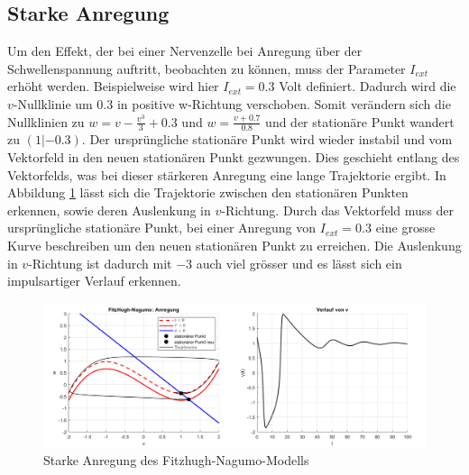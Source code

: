 \begin{refsection}
\subsection{Starke Anregung}
Um den Effekt, der bei einer Nervenzelle bei Anregung über der Schwellenspannung auftritt, beobachten zu können, muss
der Parameter $I_{ext}$ erhöht werden.
Beispielweise wird hier $I_{ext} = 0.3$ Volt definiert.
Dadurch wird die $v$-Nullklinie um 0.3 in positive w-Richtung verschoben.
Somit verändern sich die Nullklinien zu \( w = v - \frac{v^3}{3} + 0.3\)
und \(w = \frac{v + 0.7}{0.8}\) und der stationäre Punkt wandert zu $(1 |-0.3)$.
Der ursprüngliche stationäre Punkt wird wieder instabil und vom Vektorfeld in den neuen stationären Punkt
gezwungen.
Dies geschieht entlang des Vektorfelds, was bei dieser stärkeren Anregung eine lange Trajektorie ergibt.
In Abbildung \ref{fig:starkeAnregung} lässt sich die Trajektorie zwischen den stationären Punkten erkennen, sowie
deren Auslenkung in $v$-Richtung.
Durch das Vektorfeld muss der ursprüngliche stationäre Punkt, bei einer Anregung von $I_{ext} = 0.3$ eine grosse Kurve
beschreiben um den neuen stationären Punkt zu erreichen.
Die Auslenkung in $v$-Richtung ist dadurch mit $-3$ auch viel grösser und es lässt sich ein impulsartiger Verlauf erkennen.
\begin{figure}[H]
    \centering
    \includegraphics[width=\textwidth]{papers/nerven/Bilder/starkeAnregung.png}
    \caption{Starke Anregung des Fitzhugh-Nagumo-Modells}
    \label{fig:starkeAnregung}
\end{figure}


\end{refsection}

